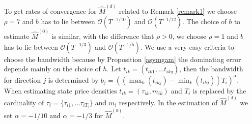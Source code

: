 To get  rates of convergence for $\hat{M}^{(d)}$ related  to Remark \ref{remark1} we choose $\rho=7$ and $b$ has to lie between $\mathcal{O}(T^{-1/10})$ and $\mathcal{O}(T^{-1/12} )$. 
The choice of $b$ to estimate $\hat{M}^{(0)}$  is similar, with the difference that $\rho>0$, we choose $\rho=1$ and $b$ has to lie between $\mathcal{O}(T^{-1/3})$ and $\mathcal{O}(T^{-1/5} )$.
We use a very easy criteria to choose the bandwidth because by Proposition \ref{asymgam} the dominating error depends mainly on the choice of $h$.
Let $t_{ik}=(t_{ik1}, \dots t_{ikg})$, then the bandwidth for direction $j$ is determined by $b_{j} = \left( (\max_k(t_{ikj})- \min_k(t_{ikj})  )T_i \right)^\alpha$. When estimating state price densities $t_{ik}=(\tau_{ik},m_{ik})$ and $T_i$ is replaced by the cardinality of $\tau_{i}=\{\tau_{i1},\dots \tau_{i T_i}\}$ and $m_{i}$ respectively. 
 In the estimation of $\hat{M}^{(d)}$ we set $\alpha=-1/10$ and $\alpha=-1/3$ for $\hat{M}^{(0)}$. %


